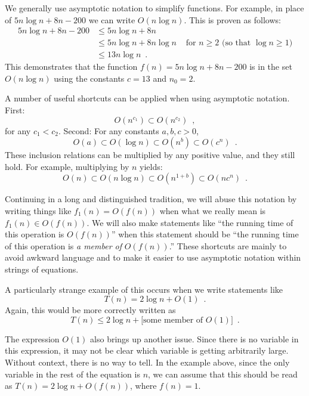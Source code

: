 We generally use asymptotic notation to simplify functions.  For example, in place of $5n\log n + 8n - 200$ we can write $O(n\log n)$.
This is proven as follows:
\begin{align*} 
       5n\log n + 8n - 200
        & \le 5n\log n + 8n \\
        & \le 5n\log n + 8n\log n & \mbox{ for $n\ge 2$ (so that $\log n \ge 1$)}
            \\
        & \le 13n\log n  \enspace .
\end{align*}
This demonstrates that the function $f(n)=5n\log n + 8n - 200$ is in the set $O(n\log n)$ using the constants $c=13$ and $n_0 = 2$.

A number of useful shortcuts can be applied when using asymptotic notation.  First:
\[ O(n^{c_1}) \subset O(n^{c_2}) \enspace ,\]
for any $c_1 < c_2$.  Second: For any constants $a,b,c > 0$,
\[ O(a) \subset O(\log n) \subset O(n^{b}) \subset O({c}^n) \enspace . \]
These inclusion relations can be multiplied by any positive value, and they still hold. For example, multiplying by $n$ yields:
\[ O(n) \subset O(n\log n) \subset O(n^{1+b}) \subset O(n{c}^n) \enspace . \]

Continuing in a long and distinguished tradition, we will abuse this notation by writing things like $f_1(n) = O(f(n))$ when what we really mean is $f_1(n) \in O(f(n))$.  We will also make statements like ``the running time of this operation is $O(f(n))$'' when this statement should be ``the running time of this operation is \emph{a member of} $O(f(n))$.'' These shortcuts are mainly to avoid awkward language and to make it easier to use asymptotic notation within strings of equations.

A particularly strange example of this occurs when we write statements like
\[
  T(n) = 2\log n + O(1)  \enspace .
\]
Again, this would be more correctly written as
\[
  T(n) \le 2\log n + [\mbox{some member of $O(1)$]}  \enspace .
\]

The expression $O(1)$ also brings up another issue. Since there is no variable in this expression, it may not be clear which variable is getting arbitrarily large.  Without context, there is no way to tell.  In the example above, since the only variable in the rest of the equation is $n$, we can assume that this should be read as $T(n) = 2\log n + O(f(n))$, where $f(n) = 1$.

